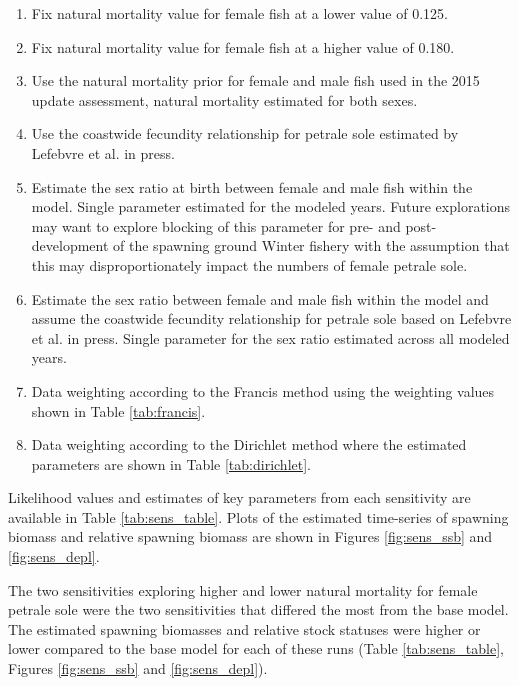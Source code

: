 \documentclass[12pt,]{article}
\begin{document}
\begin{enumerate}

  \item Fix natural mortality value for female fish at a lower value of 0.125.
  
  \item Fix natural mortality value for female fish at a higher value of 0.180.
  
  \item Use the natural mortality prior for female and male fish used in the 2015 update assessment, natural mortality estimated for both sexes.
  
  \item Use the coastwide fecundity relationship for petrale sole estimated by Lefebvre et al. in press.
  
  \item Estimate the sex ratio at birth between female and male fish within the model. Single parameter estimated for the modeled years.  Future explorations may want to explore blocking of this parameter for pre- and post-development of the spawning ground Winter fishery with the assumption that this may disproportionately impact the numbers of female petrale sole.
  
  \item Estimate the sex ratio between female and male fish within the model and assume the coastwide fecundity relationship for petrale sole based on Lefebvre et al. in press. Single parameter for the sex ratio estimated across all modeled years. 
  
  \item Data weighting according to the Francis method using the weighting values shown in Table \ref{tab:francis}. 
  
  \item Data weighting according to the Dirichlet method where the estimated parameters are shown in Table \ref{tab:dirichlet}. 
  
\end{enumerate}

Likelihood values and estimates of key parameters from each sensitivity
are available in Table \ref{tab:sens_table}. Plots of the estimated
time-series of spawning biomass and relative spawning biomass are shown
in Figures \ref{fig:sens_ssb} and \ref{fig:sens_depl}.

The two sensitivities exploring higher and lower natural mortality for
female petrale sole were the two sensitivities that differed the most
from the base model. The estimated spawning biomasses and relative stock
statuses were higher or lower compared to the base model for each of
these runs (Table \ref{tab:sens_table}, Figures \ref{fig:sens_ssb} and
\ref{fig:sens_depl}).
\end{document}
